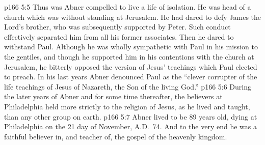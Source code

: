 \vs p166 5:5 Thus was Abner compelled to live a life of isolation. He was head of a church which was without standing at Jerusalem. He had dared to defy James the Lord’s brother, who was subsequently supported by Peter. Such conduct effectively separated him from all his former associates. Then he dared to withstand Paul. Although he was wholly sympathetic with Paul in his mission to the gentiles, and though he supported him in his contentions with the church at Jerusalem, he bitterly opposed the version of Jesus’ teachings which Paul elected to preach. In his last years Abner denounced Paul as the “clever corrupter of the life teachings of Jesus of Nazareth, the Son of the living God.”
\vs p166 5:6 During the later years of Abner and for some time thereafter, the believers at Philadelphia held more strictly to the religion of Jesus, as he lived and taught, than any other group on earth.
\vs p166 5:7 Abner lived to be 89 years old, dying at Philadelphia on the 21 day of November, A.D.~74. And to the very end he was a faithful believer in, and teacher of, the gospel of the heavenly kingdom.
